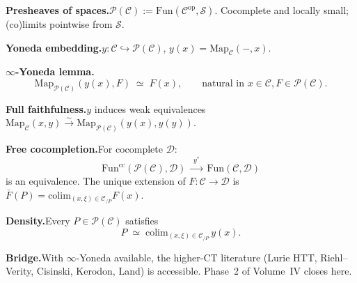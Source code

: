 \begin{formalrestatement}
\textbf{Presheaves of spaces.}\quad $\mathcal{P}(\mathcal{C}) :=
\mathrm{Fun}(\mathcal{C}^{\mathrm{op}}, \mathcal{S})$. Cocomplete and
locally small; (co)limits pointwise from $\mathcal{S}$.

\medskip
\textbf{Yoneda embedding.}\quad $y : \mathcal{C} \hookrightarrow
\mathcal{P}(\mathcal{C})$, $y(x) = \mathrm{Map}_\mathcal{C}(-, x)$.

\medskip
\textbf{$\infty$-Yoneda lemma.}\quad
\begin{equation*}
  \mathrm{Map}_{\mathcal{P}(\mathcal{C})}(y(x), F) \;\simeq\; F(x),
  \qquad \text{natural in } x \in \mathcal{C}, F \in \mathcal{P}(\mathcal{C}).
\end{equation*}

\medskip
\textbf{Full faithfulness.}\quad $y$ induces weak equivalences
$\mathrm{Map}_\mathcal{C}(x, y) \xrightarrow{\sim} \mathrm{Map}_{\mathcal{P}(\mathcal{C})}(y(x), y(y))$.

\medskip
\textbf{Free cocompletion.}\quad For cocomplete $\mathcal{D}$:
\begin{equation*}
  \mathrm{Fun}^{\mathrm{cc}}(\mathcal{P}(\mathcal{C}), \mathcal{D}) \;\xrightarrow{\;y^*\;}\; \mathrm{Fun}(\mathcal{C}, \mathcal{D})
\end{equation*}
is an equivalence. The unique extension of $F : \mathcal{C} \to \mathcal{D}$
is $\bar F(P) = \mathrm{colim}_{(x, \xi) \in \mathcal{C}_{/P}} F(x)$.

\medskip
\textbf{Density.}\quad Every $P \in \mathcal{P}(\mathcal{C})$ satisfies
\begin{equation*}
  P \;\simeq\; \mathrm{colim}_{(x, \xi) \in \mathcal{C}_{/P}} \, y(x).
\end{equation*}

\medskip
\textbf{Bridge.}\quad With $\infty$-Yoneda available, the higher-CT
literature (Lurie HTT, Riehl–Verity, Cisinski, Kerodon, Land) is
accessible. Phase~2 of Volume~IV closes here.
\end{formalrestatement}
